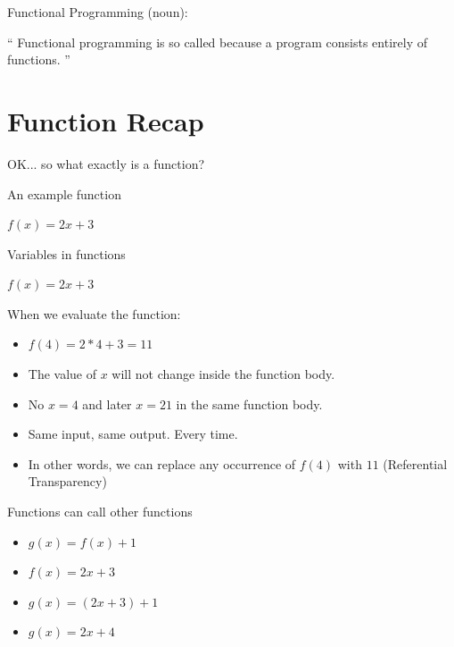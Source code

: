 \documentclass{beamer}
\begin{document}
\begin{frame}{Functional Programming (noun):}

\begin{exampleblock}{}
  {\Large ``
  Functional programming is so called because a program consists entirely of functions.
  ''}
  \vskip5mm
  \hspace*{}
\end{exampleblock}
\end{frame}

\section{Function Recap}

\begin{frame}{}
OK... so what exactly is a function?
\end{frame}

\begin{frame}{An example function}

  {\Huge $f(x) = 2x + 3$}

\end{frame}

\begin{frame}{Variables in functions}

  {\Huge $f(x) = 2x + 3$}

When we evaluate the function:
  \begin{itemize}[<+->]
    \item $f(4) = 2*4 + 3 = 11$
    \item The value of $x$ will not change inside the function body.
    \item No $x = 4$ and later $x = 21$ in the same function body.
    \item Same input, same output. Every time.
    \item In other words, we can replace any occurrence of $f(4)$ with
      $11$ (Referential Transparency)
  \end{itemize}
\end{frame}


\begin{frame}{Functions can call other functions}

  \begin{itemize}[<+->]
  \item {\Huge $g(x) = f(x) + 1$}
  \item {\Huge $f(x) = 2x + 3$}
  \item {\Huge $g(x) = (2x + 3) + 1$}
  \item {\Huge $g(x) = 2x + 4$}
  \end{itemize}

\end{frame}
\end{document}

